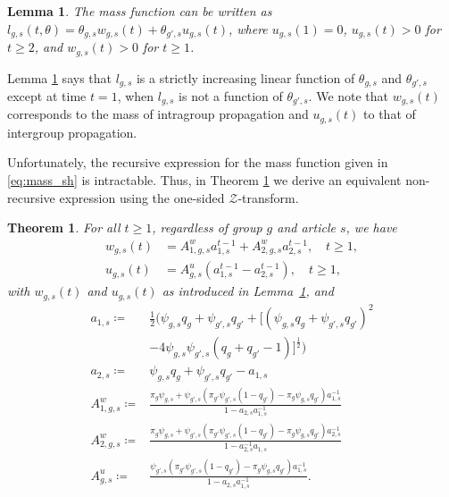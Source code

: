 \documentclass[letterpaper]{article} %
\newtheorem{theorem}{Theorem}
\newtheorem{lemma}{Lemma}
\begin{document}
\begin{lemma}
\label{lemma:incr_linear}
     The mass function can be written as $l_{g,s}(t,\theta) = \theta_{g,s}w_{g,s}(t) + \theta_{g',s}u_{g,s}(t)$, where $u_{g,s}(1) = 0$, $u_{g,s}(t) > 0$ for $t\geq 2$, and $w_{g,s}(t) > 0$ for $t \geq 1$.
\end{lemma}
Lemma \ref{lemma:incr_linear} says that $l_{g,s}$ is a strictly increasing linear function of $\theta_{g,s}$ and $\theta_{g',s}$ except at time $t=1$, when $l_{g,s}$ is not a function of $\theta_{g',s}$.
We note that $w_{g,s}(t)$ corresponds to the mass of intragroup propagation and $u_{g,s}(t)$ to that of intergroup propagation.

Unfortunately, the recursive expression for the mass function given in \eqref{eq:mass_sh} is intractable.
Thus, in Theorem \ref{theorem:closed_form_Z_transform_of_coeffs} we derive an equivalent non-recursive expression using the one-sided $\mathcal{Z}$-transform.

\begin{theorem}\label{theorem:closed_form_Z_transform_of_coeffs}
For all $t\geq 1$, regardless of group $g$ and article $s$, we have
\footnotesize
\begin{align}
    w_{g,s}(t) &=
    A^w_{1,g,s}a_{1,s}^{t-1} + A^w_{2,g,s}a_{2,s}^{t-1}, \quad  t\geq 1, \\
    u_{g,s}(t) &=
    A^u_{g,s}(a_{1,s}^{t-1} - a_{2,s}^{t-1}), \quad  t\geq 1,
\end{align}
\normalsize
with $w_{g,s}(t)$ and $u_{g,s}(t)$ as introduced in Lemma~\ref{lemma:incr_linear}, and
\footnotesize
\begin{align*}
    a_{1,s} \coloneqq &\frac{1}{2} \Big( \psi_{g,s}q_g + \psi_{g',s}q_{g'} + \big[ (\psi_{g,s}q_g + \psi_{g',s}q_{g'})^2 \\
    &- 4 \psi_{g,s}\psi_{g',s}(q_g + q_{g'} -1) \big]^{\frac{1}{2}} \Big) \\
    a_{2,s} \coloneqq &\psi_{g,s}q_g + \psi_{g',s}q_{g'} - a_{1,s} \\
    A^w_{1,g,s} \coloneqq &\frac{ \pi_g \psi_{g,s} + \psi_{g',s}\left( \pi_{g'} \psi_{g',s}(1-q_{g'}) - \pi_g \psi_{g,s} q_{g'}\right)a_{1,s}^{-1}}{1-a_{2,s}a_{1,s}^{-1}} \\
    A^w_{2,g,s} \coloneqq &\frac{ \pi_g \psi_{g,s} + \psi_{g',s}\left( \pi_{g'} \psi_{g',s}(1-q_{g'}) - \pi_g \psi_{g,s} q_{g'}\right)a_{2,s}^{-1}}{1-a_{2,s}^{-1}a_{1,s}} \\
    A^u_{g,s} \coloneqq &\frac{ \psi_{g',s}\left( \pi_{g'} \psi_{g',s}(1-q_{g'}) - \pi_g \psi_{g,s} q_{g'}\right)a_{1,s}^{-1}}{1-a_{2,s}a_{1,s}^{-1}}.
\end{align*}
\normalsize
\end{theorem}
\end{document}
